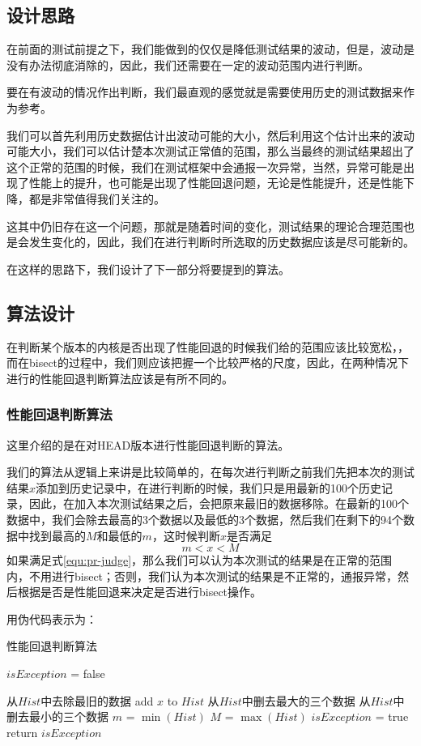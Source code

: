 \subsection{设计思路}
在前面的测试前提之下，我们能做到的仅仅是降低测试结果的波动，但是，波动是没有办法彻底消除的，因此，我们还需要在一定的波动范围内进行判断。

要在有波动的情况作出判断，我们最直观的感觉就是需要使用历史的测试数据来作为参考。

我们可以首先利用历史数据估计出波动可能的大小，然后利用这个估计出来的波动可能大小，我们可以估计楚本次测试正常值的范围，那么当最终的测试结果超出了这个正常的范围的时候，我们在测试框架中会通报一次异常，当然，异常可能是出现了性能上的提升，也可能是出现了性能回退问题，无论是性能提升，还是性能下降，都是非常值得我们关注的。

这其中仍旧存在这一个问题，那就是随着时间的变化，测试结果的理论合理范围也是会发生变化的，因此，我们在进行判断时所选取的历史数据应该是尽可能新的。

在这样的思路下，我们设计了下一部分将要提到的算法。

\subsection{算法设计}
在判断某个版本的内核是否出现了性能回退的时候我们给的范围应该比较宽松，，而在bisect的过程中，我们则应该把握一个比较严格的尺度，因此，在两种情况下进行的性能回退判断算法应该是有所不同的。

\subsubsection{性能回退判断算法}
这里介绍的是在对HEAD版本进行性能回退判断的算法。

我们的算法从逻辑上来讲是比较简单的，在每次进行判断之前我们先把本次的测试结果$x$添加到历史记录中，在进行判断的时候，我们只是用最新的100个历史记录，因此，在加入本次测试结果之后，会把原来最旧的数据移除。在最新的100个数据中，我们会除去最高的3个数据以及最低的3个数据，然后我们在剩下的94个数据中找到最高的$M$和最低的$m$，这时候判断$x$是否满足
\begin{equation}
\label{equ:pr-judge}
m<x<M
\end{equation}
如果满足式\ref{equ:pr-judge}，那么我们可以认为本次测试的结果是在正常的范围内，不用进行bisect；否则，我们认为本次测试的结果是不正常的，通报异常，然后根据是否是性能回退来决定是否进行bisect操作。

用伪代码表示为：

\begin{algorithm}
\caption{性能回退判断算法}
$isException$ = false\;

从$Hist$中去除最旧的数据\;
add $x$ to $Hist$\;
从$Hist$中删去最大的三个数据\;
从$Hist$中删去最小的三个数据\;
$m$ = $\min(Hist)$\;
$M$ = $\max(Hist)$\;
{
	$isException$ = true\;
}
return $isException$\;
\end{algorithm}


